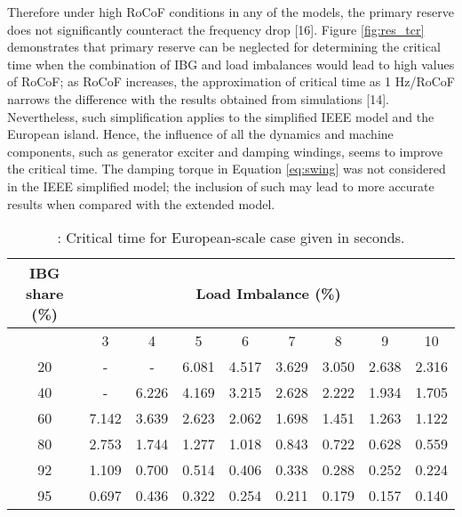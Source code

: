 Therefore under high RoCoF conditions in any of the models, the primary reserve does not significantly counteract the frequency drop [16]. Figure \ref{fig:res_tcr} demonstrates that primary reserve can be neglected for determining the critical time when the combination of IBG and load imbalances would lead to high values of RoCoF; as RoCoF increases, the approximation of critical time as 1 Hz/RoCoF narrows the difference with the results obtained from simulations [14]. Nevertheless, such simplification applies to the simplified IEEE model and the European island. Hence, the influence of all the dynamics and machine components, such as
generator exciter and damping windings, seems to improve the critical time. The damping torque in Equation \eqref{eq:swing} was not considered in the IEEE simplified model; the inclusion of such may lead to more accurate results when compared with the extended model.\\
\begin{table}[h]
	\caption{\label{tb:crtime}: Critical time for European-scale case given in seconds.}
	\centering
	\begin{tabular}{*9c}
		\toprule
		\textbf{IBG share (\%)}	& \multicolumn{8}{c}{\textbf{Load Imbalance (\%)}} \\
		\midrule
		{} & 3&	4&	5&	6&	7&	8&	9	&10 \\
		\midrule
		20&	-&	-&	6.081&	4.517&	3.629&	3.050&	2.638&	2.316\\
		40&	-&	6.226&	4.169&	3.215&	2.628&	2.222&	1.934&	1.705\\
		60	&7.142&	3.639&	2.623&	2.062&	1.698&	1.451&	1.263&	1.122\\
		80&	2.753&	1.744&	1.277&	1.018&	0.843&	0.722&	0.628&	0.559\\
		92&	1.109&	0.700&	0.514&	0.406&	0.338&	0.288&	0.252&	0.224\\
		95&	0.697&	0.436&	0.322&	0.254&	0.211&	0.179&	0.157&	0.140\\
		\bottomrule
	\end{tabular}
\end{table}







